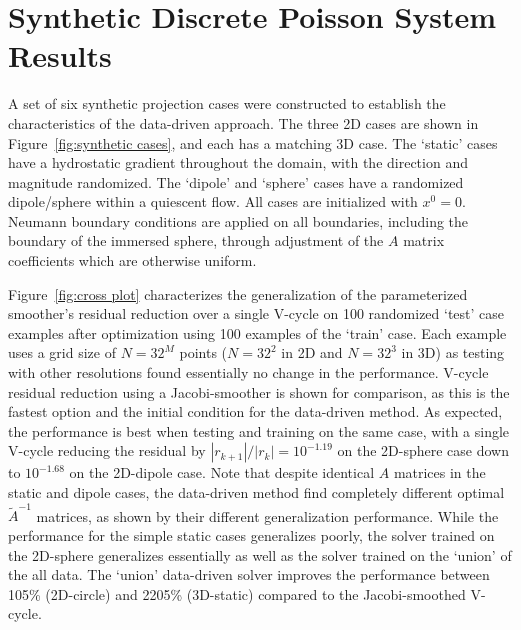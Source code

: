 \documentclass[review]{elsarticle}
\begin{document}
\section{Synthetic Discrete Poisson System Results}

A set of six synthetic projection cases were constructed to establish the characteristics of the data-driven approach. The three 2D cases are shown in Figure~\ref{fig:synthetic cases}, and each has a matching 3D case. The `static' cases have a hydrostatic gradient throughout the domain, with the direction and magnitude randomized. The `dipole' and `sphere' cases have a randomized dipole/sphere within a quiescent flow. All cases are initialized with $x^0=0$.
Neumann boundary conditions are applied on all boundaries, including the boundary of the immersed sphere, through adjustment of the $A$ matrix coefficients which are otherwise uniform. 

Figure~\ref{fig:cross plot} characterizes the generalization of the parameterized smoother's residual reduction over a single V-cycle on 100 randomized `test' case examples after optimization using 100 examples of the `train' case. Each example uses a grid size of $N=32^M$ points ($N=32^2$ in 2D and $N=32^3$ in 3D) as testing with other resolutions found essentially no change in the performance. V-cycle residual reduction using a Jacobi-smoother is shown for comparison, as this is the fastest option and the initial condition for the data-driven method. As expected, the performance is best when testing and training on the same case, with a single V-cycle reducing the residual by $|r_{k+1}|/|r_k|=10^{-1.19}$ on the 2D-sphere case down to $10^{-1.68}$ on the 2D-dipole case. Note that despite identical $A$ matrices in the static and dipole cases, the data-driven method find completely different optimal $\tilde A^{-1}$ matrices, as shown by their different generalization performance. While the performance for the simple static cases generalizes poorly, the solver trained on the 2D-sphere generalizes essentially as well as the solver trained on the `union' of the all data. The `union' data-driven solver improves the performance between 105\% (2D-circle) and 2205\% (3D-static) compared to the Jacobi-smoothed V-cycle.
\end{document}
